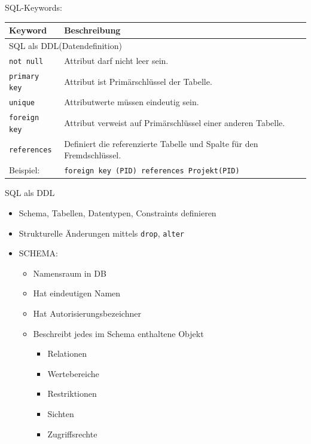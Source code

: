 \documentclass{article}
\begin{document}
SQL-Keywords:
\begin{center}
  \begin{tabular}{|p{4cm}|p{7cm}|}
    \hline
    \textbf{Keyword} & \textbf{Beschreibung} \\
    \hline
    \multicolumn{2}{|p{11cm}|}{SQL als DDL(Datendefinition)} \\
    \hline
    \texttt{not null} & Attribut darf nicht leer sein. \\
    \hline
    \texttt{primary key} & Attribut ist Primärschlüssel der Tabelle. \\
    \hline
    \texttt{unique} & Attributwerte müssen eindeutig sein. \\
    \hline
    \texttt{foreign key} & Attribut verweist auf Primärschlüssel einer anderen Tabelle. \\
    \hline
    \texttt{references} & Definiert die referenzierte Tabelle und Spalte für den Fremdschlüssel. \\
    \hline
    Beispiel: & \texttt{foreign key (PID) references Projekt(PID)} \\
    \hline
  \end{tabular}
\end{center}

\begin{block}{SQL als DDL}
  \begin{itemize}
    \item Schema, Tabellen, Datentypen, Constraints definieren
    \item Strukturelle Änderungen mittels \texttt{drop}, \texttt{alter}
    \item SCHEMA:
    \begin{itemize}
      \item Namensraum in DB
      \item Hat eindeutigen Namen
      \item Hat Autorisierungsbezeichner
      \item Beschreibt jedes im Schema enthaltene Objekt
      \begin{itemize}
        \item Relationen
        \item Wertebereiche
        \item Restriktionen
        \item Sichten
        \item Zugriffsrechte
      \end{itemize}
    \end{itemize}
  \end{itemize}
\end{block}
\end{document}
